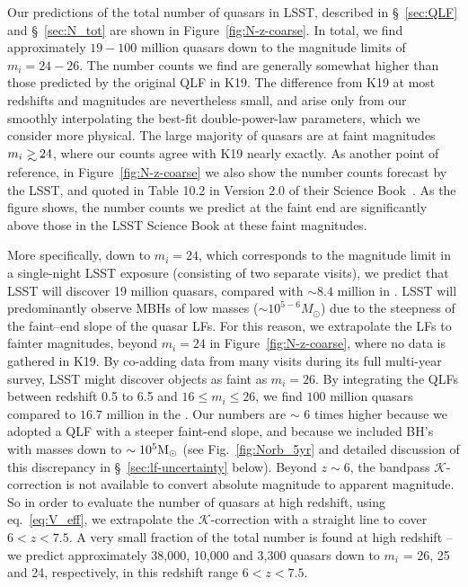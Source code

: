 \documentclass[fleqn,usenatbib]{mnras}
\newcommand\gsim{\mathrel{\rlap{\lower4pt\hbox{\hskip1pt$\sim$}}
        \raise1pt\hbox{$>$}}}
\begin{document}
Our predictions of the total number of quasars in LSST, described in \S~\ref{sec:QLF} and \S~\ref{sec:N_tot} are shown in Figure~\ref{fig:N-z-coarse}.   In total, we find approximately $19-100$ million quasars down to the magnitude limits of $m_i=24-26$. The number counts we find
are generally somewhat higher than those predicted by the original QLF in K19.  The difference from K19 at most redshifts and magnitudes are nevertheless small, and arise only from our smoothly interpolating the best-fit double-power-law parameters, which we consider more physical.  The large majority of quasars are at faint magnitudes $m_i\gsim 24$, where our counts agree with K19 nearly exactly.
As another point of reference, in Figure~\ref{fig:N-z-coarse} we also show the number counts forecast by the LSST, and quoted in Table 10.2 in Version 2.0 of their Science Book~\cite{LSSTScienceCollaboration2009}.
As the figure shows,  the number counts we predict at the faint end are significantly above those in the LSST Science Book at these faint magnitudes.  

More specifically, down to $m_i=24$, which corresponds to the magnitude limit in a single-night LSST exposure (consisting of two separate visits), we predict that LSST will discover 19 million quasars, compared with $\sim8.4$ million in \citet{LSSTScienceCollaboration2009}. 
LSST will predominantly observe MBHs of low masses ($\sim 10^{5-6} M_{\odot}$) due to the steepness of the faint--end slope of the quasar LFs. For this reason, we extrapolate the LFs to fainter magnitudes, beyond $m_i=24$ in Figure~\ref{fig:N-z-coarse}, where no data is gathered in K19. By co-adding data from many visits during its full multi-year survey, LSST might discover objects as faint as $m_i=26$.
By integrating the QLFs between redshift 0.5 to 6.5 and $16\leq m_i\leq 26$,  we find $100$ million quasars compared to $16.7$ million in the \citealt{LSSTScienceCollaboration2009}.
Our numbers are $\sim$ 6 times higher because we adopted a QLF with a steeper faint-end slope, and because we included BH's with masses down to $\sim 10^5 {\rm M_\odot}$ (see Fig.~\ref{fig:Norb_5yr} and detailed discussion of this discrepancy in \S~\ref{sec:lf-uncertainty} below). Beyond $z\sim6$, the bandpass $\mathcal{K}$-correction is not available to convert absolute magnitude to apparent magnitude. So in order to evaluate the number of quasars at high redshift, using eq.~\ref{eq:V_eff}, we extrapolate the $\mathcal{K}$-correction with a straight line to cover $6<z<7.5$. A very small fraction of the total number is found at high redshift -- we predict approximately 38,000, 10,000 and 3,300 quasars down to $m_i$ = 26, 25 and 24, respectively, in this redshift range $6<z<7.5$.
\end{document}
